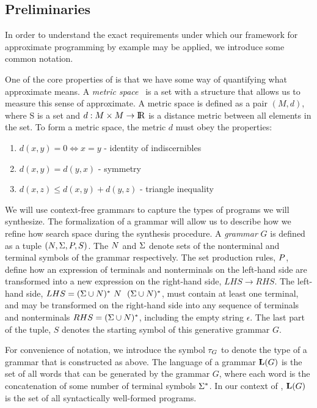 \subsection{Preliminaries}

In order to understand the exact requirements under which our framework for approximate programming by example may be applied, we introduce some common notation.

One of the core properties of \approximatePBE is that we have some way of quantifying what approximate means.
A \textit{metric space}~\cite{textbook} is a set with a structure that allows us to measure this sense of approximate.
A metric space is defined as a pair $(M,d)$, where S is a set and $d:M \times M \to {\rm I\!R}$ is a distance metric between all elements in the set. 
To form a metric space, the metric $d$ must obey the properties:

\begin{enumerate}
  \item $d(x,y) = 0 \Leftrightarrow x = y$ - identity of indiscernibles
  \item $d(x,y)  = d(y,x)$ - symmetry
  \item $d(x,z) \le d(x,y) + d(y, z)$ - triangle inequality
\end{enumerate}

We will use context-free grammars to capture the types of programs we will synthesize.
The formalization of a grammar will allow us to describe how we refine how search space during the synthesis procedure.
A \textit{grammar} $G$ is defined as a tuple $(N,\Sigma,P,S)$.
The $N$ and $\Sigma$ denote sets of the nonterminal and terminal symbols of the grammar respectively.
The set production rules, $P$, define how an expression of terminals and nonterminals on the left-hand side are transformed into a new expression on the right-hand side, $LHS \to RHS$.
The left-hand side, $LHS = (\Sigma \cup N)^{*} \ N \ \ (\Sigma \cup N)^{*}$, must contain at least one terminal, 
  and may be transformed on the right-hand side into any sequence of terminals and nonterminals $RHS = (\Sigma \cup N)^{*}$, including the empty string $\epsilon$.
The last part of the tuple, $S$ denotes the starting symbol of this generative grammar $G$.

For convenience of notation, we introduce the symbol $\tau_{G}$ to denote the type of a grammar that is constructed as above.
The language of a grammar $\mathbf{L}(G)$ is the set of all words that can be generated by the grammar $G$, where each word is the concatenation of some number of terminal symbols $\Sigma^{*}$.
In our context of \approximatePBE, $\mathbf{L}(G)$ is the set of all syntactically well-formed programs.



